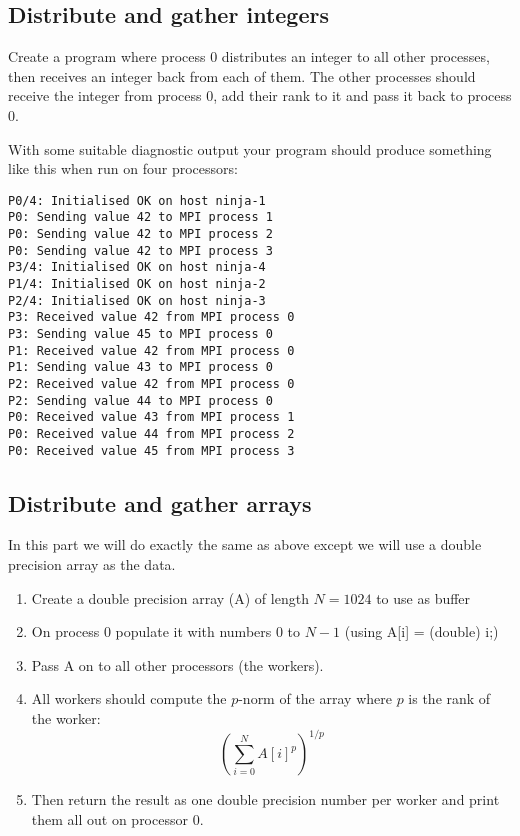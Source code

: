 \documentclass[12pt]{article}
\begin{document}
\subsection*{Distribute and gather integers}

Create a program where process 0 distributes an integer to all other processes,
then receives an integer back from each of them.
The other processes should receive the integer from process 0, add their
rank to it and pass it back to process 0.

With some suitable diagnostic output your program should produce
something like this when run on four processors:

\begin{verbatim}
P0/4: Initialised OK on host ninja-1
P0: Sending value 42 to MPI process 1
P0: Sending value 42 to MPI process 2
P0: Sending value 42 to MPI process 3
P3/4: Initialised OK on host ninja-4
P1/4: Initialised OK on host ninja-2
P2/4: Initialised OK on host ninja-3
P3: Received value 42 from MPI process 0
P3: Sending value 45 to MPI process 0
P1: Received value 42 from MPI process 0
P1: Sending value 43 to MPI process 0
P2: Received value 42 from MPI process 0
P2: Sending value 44 to MPI process 0
P0: Received value 43 from MPI process 1
P0: Received value 44 from MPI process 2
P0: Received value 45 from MPI process 3
\end{verbatim}


\subsection*{Distribute and gather arrays}

In this part we will do exactly the same as above except we will use
a double precision array as the data.

\begin{enumerate}
  \item Create a double precision array (A) of length $N=1024$ to use as buffer
  \item On process 0 populate it with numbers $0$ to $N-1$
  (using A[i] = (double) i;)
  \item Pass A on to all other processors (the workers).
  \item All workers should compute the $p$-norm of the array
  where $p$ is the rank of the worker:
  \[
    \left(
      \sum_{i=0}^N A[i]^p
    \right)^{1/p}
  \]
  \item Then return the result as one double precision number per worker and
  print them all out on processor 0.
\end{enumerate}
\end{document}
